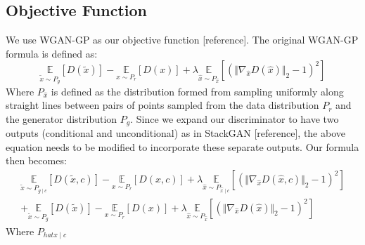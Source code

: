 \subsection{Objective Function}
We use WGAN-GP as our objective function [reference]. The original WGAN-GP formula is defined as:
\begin{equation}
\underset{\tilde{x} \sim P_g}{\mathbb{E}}[D(\tilde{x})] - \underset{x \sim P_r}{\mathbb{E}}[D(x)] + \lambda \underset{\hat{x} \sim P_\hat{x}}{\mathbb{E}}[(\Vert \nabla_\hat{x} D(\hat{x}) \Vert_2 - 1)^2]
\end{equation}
Where $P_\hat{x}$ is defined as the distribution formed from sampling uniformly along straight lines between pairs of points sampled from the data distribution $P_r$ and the generator distribution $P_g$. Since we expand our discriminator to have two outputs (conditional and unconditional) as in StackGAN [reference], the above equation needs to be modified to incorporate these separate outputs. Our formula then becomes:
\begin{equation}
\begin{align*}
\underset{\tilde{x} \sim P_{g \mid c}}{\mathbb{E}}[D(\tilde{x}, c)] - \underset{x \sim P_r}{\mathbb{E}}[D(x, c)] + \lambda \underset{\hat{x} \sim P_{\hat{x} \mid c}}{\mathbb{E}}[(\Vert \nabla_\hat{x} D(\hat{x}, c) \Vert_2 - 1)^2] \\
+ \underset{\tilde{x} \sim P_g}{\mathbb{E}}[D(\tilde{x})] - \underset{x \sim P_r}{\mathbb{E}}[D(x)] + \lambda \underset{\hat{x} \sim P_\hat{x}}{\mathbb{E}}[(\Vert \nabla_\hat{x} D(\hat{x}) \Vert_2 - 1)^2]
\end{align*}
\end{equation}
Where $P_{hat{x} \mid c}$ 